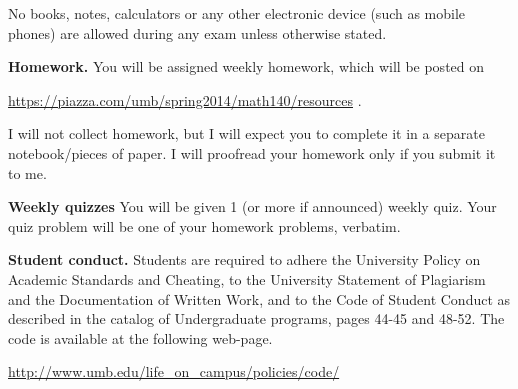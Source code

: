 \documentclass{article}
\begin{document}
No books, notes, calculators or any other electronic device (such as mobile phones) are allowed during any exam unless otherwise stated.

\medskip
\noindent \textbf{Homework.} You will be assigned weekly homework, which will be posted on

\url{https://piazza.com/umb/spring2014/math140/resources} \quad \quad \quad .

\noindent I will not collect homework, but I will expect you to complete it in a separate notebook/pieces of paper. I will proofread your homework only if you submit it to me.
 
 \medskip
\noindent \textbf{Weekly quizzes} You will be given 1 (or more if announced) weekly quiz. Your quiz problem will be one of your homework problems, verbatim. %



\medskip
\noindent \textbf{Student conduct.} Students  are required to adhere the University Policy on Academic Standards and Cheating, to the University Statement of Plagiarism and the Documentation of Written Work, and to the Code of Student Conduct as described in the catalog of Undergraduate programs, pages 44-45 and 48-52. The code is available at the following web-page.

\noindent\url{http://www.umb.edu/life_on_campus/policies/code/}
\end{document}
